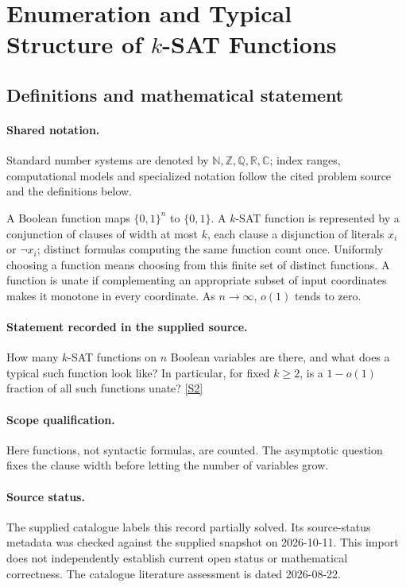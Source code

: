 \documentclass[11pt]{article}
\newcommand{\sref}[2]{\hyperlink{source:#1:#2}{[S#2]}}
\begin{document}
\section{Enumeration and Typical Structure of $k$-SAT Functions}\label{statement}

\subsection{Definitions and mathematical statement}

\paragraph{Shared notation.}Standard number systems are denoted by $\mathbb N,\mathbb Z,\mathbb Q,\mathbb R,\mathbb C$; index ranges, computational models and specialized notation follow the cited problem source and the definitions below.


A Boolean function maps $\{0,1\}^n$ to $\{0,1\}$. A $k$-SAT function is represented by a conjunction of clauses of width at most $k$, each clause a disjunction of literals $x_i$ or $\neg x_i$; distinct formulas computing the same function count once. Uniformly choosing a function means choosing from this finite set of distinct functions. A function is unate if complementing an appropriate subset of input coordinates makes it monotone in every coordinate. As $n\to\infty$, $o(1)$ tends to zero.
\paragraph{Statement recorded in the supplied source.}
How many $k$-SAT functions on $n$ Boolean variables are there, and what does a typical such function look like? In particular, for fixed $k\geq 2$, is a $1-o(1)$ fraction of all such functions unate? \sref{statement}{2}
\paragraph{Scope qualification.}
Here functions, not syntactic formulas, are counted. The asymptotic question fixes the clause width before letting the number of variables grow.
\paragraph{Source status.}
The supplied catalogue labels this record partially solved. Its source-status metadata was checked against the supplied snapshot on 2026-10-11. This import does not independently establish current open status or mathematical correctness. The catalogue literature assessment is dated 2026-08-22.
\end{document}
